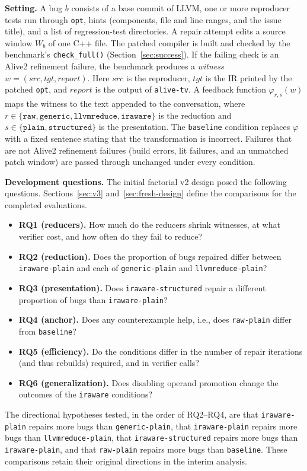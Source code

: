 \documentclass[conference]{IEEEtran}
\newcommand{\cn}[1]{\texttt{#1}}   %
\begin{document}
\textbf{Setting.} A bug $b$ consists of a base commit of LLVM, one or more reproducer tests run through \texttt{opt}, hints (components, file and line ranges, and the issue title), and a list of regression-test directories. A repair attempt edits a source window $W_b$ of one C++ file. The patched compiler is built and checked by the benchmark's \texttt{check\_full()} (Section~\ref{sec:success}). If the failing check is an Alive2 refinement failure, the benchmark produces a \emph{witness} $w=(\mathit{src},\mathit{tgt},\mathit{report})$. Here $\mathit{src}$ is the reproducer, $\mathit{tgt}$ is the IR printed by the patched \texttt{opt}, and $\mathit{report}$ is the output of \texttt{alive-tv}. A feedback function $\varphi_{r,s}(w)$ maps the witness to the text appended to the conversation, where $r\in\{\texttt{raw},\texttt{generic},\texttt{llvmreduce},\texttt{iraware}\}$ is the reduction and $s\in\{\texttt{plain},\texttt{structured}\}$ is the presentation. The \cn{baseline} condition replaces $\varphi$ with a fixed sentence stating that the transformation is incorrect. Failures that are not Alive2 refinement failures (build errors, lit failures, and an unmatched patch window) are passed through unchanged under every condition.

\textbf{Development questions.} The initial factorial v2 design posed the following questions. Sections~\ref{sec:v3} and~\ref{sec:fresh-design} define the comparisons for the completed evaluations.
\begin{itemize}
\item \textbf{RQ1 (reducers).} How much do the reducers shrink witnesses, at what verifier cost, and how often do they fail to reduce?
\item \textbf{RQ2 (reduction).} Does the proportion of bugs repaired differ between \cn{iraware-plain} and each of \cn{generic-plain} and \cn{llvmreduce-plain}?
\item \textbf{RQ3 (presentation).} Does \cn{iraware-structured} repair a different proportion of bugs than \cn{iraware-plain}?
\item \textbf{RQ4 (anchor).} Does any counterexample help, i.e., does \cn{raw-plain} differ from \cn{baseline}?
\item \textbf{RQ5 (efficiency).} Do the conditions differ in the number of repair iterations (and thus rebuilds) required, and in verifier calls?
\item \textbf{RQ6 (generalization).} Does disabling operand promotion change the outcomes of the \cn{iraware} conditions?
\end{itemize}
The directional hypotheses tested, in the order of RQ2--RQ4, are that \cn{iraware-plain} repairs more bugs than \cn{generic-plain}, that \cn{iraware-plain} repairs more bugs than \cn{llvmreduce-plain}, that \cn{iraware-structured} repairs more bugs than \cn{iraware-plain}, and that \cn{raw-plain} repairs more bugs than \cn{baseline}. These comparisons retain their original directions in the interim analysis.
\end{document}
